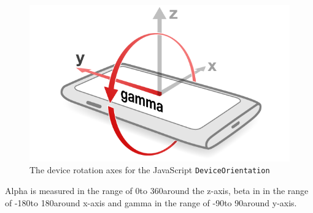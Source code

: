 \begin{figure}[H]
\begin{minipage}[c]{.23\textwidth}
  \end{minipage}
  \hspace{1cm}
  \begin{minipage}[c]{.23\textwidth}
    \centering
    \includegraphics[scale=0.2]{img/device-gamma}
    \hspace{1cm}
  \end{minipage}
  \caption{The device rotation axes for the JavaScript \texttt{DeviceOrientation}}
  \label{fig:device-rot}
\end{figure}
Alpha is measured in the range of 0\degree to 360\degree around the z-axis, beta in in the range of -180\degree to 180\degree around x-axis and gamma in the range of -90\degree to 90\degree around y-axis.\cite[]{sensor:W3C}



